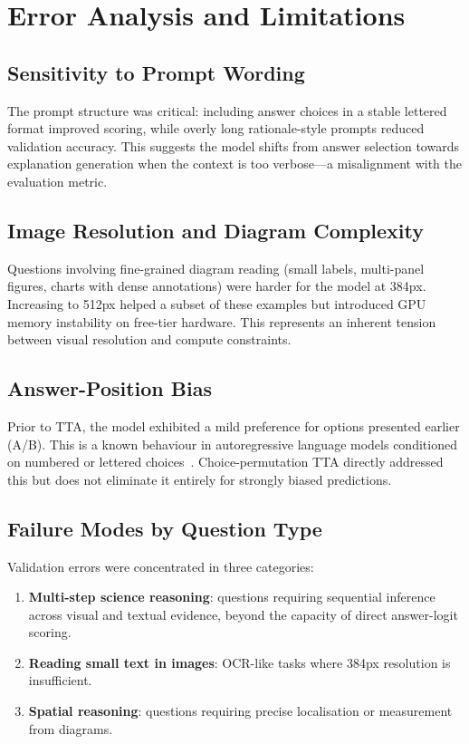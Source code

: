 \documentclass[11pt,twocolumn]{article}
\begin{document}
\section{Error Analysis and Limitations}
\label{sec:error}

\subsection{Sensitivity to Prompt Wording}

The prompt structure was critical: including answer choices in a stable lettered format improved scoring, while overly long rationale-style prompts reduced validation accuracy. This suggests the model shifts from answer selection towards explanation generation when the context is too verbose---a misalignment with the evaluation metric.

\subsection{Image Resolution and Diagram Complexity}

Questions involving fine-grained diagram reading (small labels, multi-panel figures, charts with dense annotations) were harder for the model at 384px. Increasing to 512px helped a subset of these examples but introduced GPU memory instability on free-tier hardware. This represents an inherent tension between visual resolution and compute constraints.

\subsection{Answer-Position Bias}

Prior to TTA, the model exhibited a mild preference for options presented earlier (A/B). This is a known behaviour in autoregressive language models conditioned on numbered or lettered choices~\cite{zhao2021calibrate}. Choice-permutation TTA directly addressed this but does not eliminate it entirely for strongly biased predictions.

\subsection{Failure Modes by Question Type}

Validation errors were concentrated in three categories:
\begin{enumerate}[leftmargin=*, noitemsep, topsep=3pt]
  \item \textbf{Multi-step science reasoning}: questions requiring sequential inference across visual and textual evidence, beyond the capacity of direct answer-logit scoring.
  \item \textbf{Reading small text in images}: OCR-like tasks where 384px resolution is insufficient.
  \item \textbf{Spatial reasoning}: questions requiring precise localisation or measurement from diagrams.
\end{enumerate}
\end{document}
